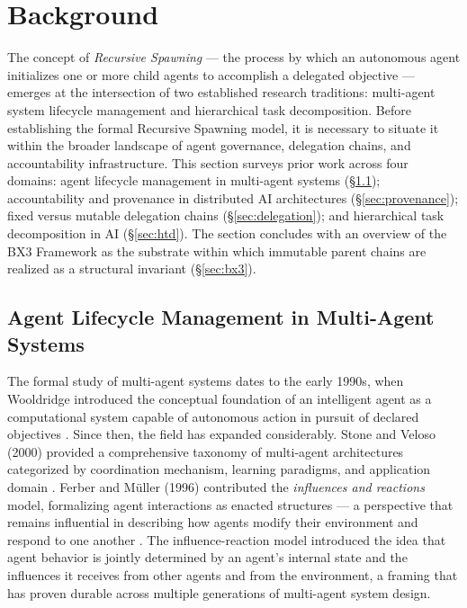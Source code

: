 \section{Background}
\label{sec:background}

The concept of \textit{Recursive Spawning} — the process by which an autonomous agent initializes one or more child agents to accomplish a delegated objective — emerges at the intersection of two established research traditions: multi-agent system lifecycle management and hierarchical task decomposition. Before establishing the formal Recursive Spawning model, it is necessary to situate it within the broader landscape of agent governance, delegation chains, and accountability infrastructure. This section surveys prior work across four domains: agent lifecycle management in multi-agent systems (\S\ref{sec:lifecycle}); accountability and provenance in distributed AI architectures (\S\ref{sec:provenance}); fixed versus mutable delegation chains (\S\ref{sec:delegation}); and hierarchical task decomposition in AI (\S\ref{sec:htd}). The section concludes with an overview of the BX3 Framework as the substrate within which immutable parent chains are realized as a structural invariant (\S\ref{sec:bx3}).

\subsection{Agent Lifecycle Management in Multi-Agent Systems}
\label{sec:lifecycle}

The formal study of multi-agent systems dates to the early 1990s, when Wooldridge introduced the conceptual foundation of an intelligent agent as a computational system capable of autonomous action in pursuit of declared objectives \cite{wooldridge1995}. Since then, the field has expanded considerably. Stone and Veloso (2000) provided a comprehensive taxonomy of multi-agent architectures categorized by coordination mechanism, learning paradigms, and application domain \cite{stone2000}. Ferber and M\"uller (1996) contributed the \textit{influences and reactions} model, formalizing agent interactions as enacted structures — a perspective that remains influential in describing how agents modify their environment and respond to one another \cite{ferber1996}. The influence-reaction model introduced the idea that agent behavior is jointly determined by an agent's internal state and the influences it receives from other agents and from the environment, a framing that has proven durable across multiple generations of multi-agent system design.

